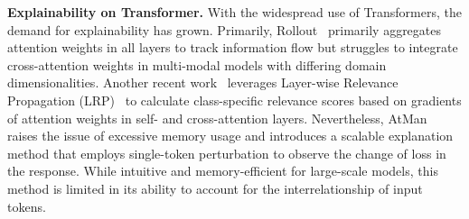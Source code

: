 \textbf{Explainability on Transformer.} With the widespread use of Transformers, the demand for explainability has grown. Primarily, Rollout~\cite{abnar2020quantifying} primarily aggregates attention weights in all layers to track information flow but struggles to integrate cross-attention weights in multi-modal models with differing domain dimensionalities. Another recent work~\cite{chefer2021generic} leverages Layer-wise Relevance Propagation (LRP)~\cite{samek2017explainable} to calculate class-specific relevance scores based on gradients of attention weights in self- and cross-attention layers. Nevertheless, AtMan~\cite{deiseroth2023atman} raises the issue of excessive memory usage and introduces a scalable explanation method that employs single-token perturbation to observe the change of loss in the response. While intuitive and memory-efficient for large-scale models, this method is limited in its ability to account for the interrelationship of input tokens.